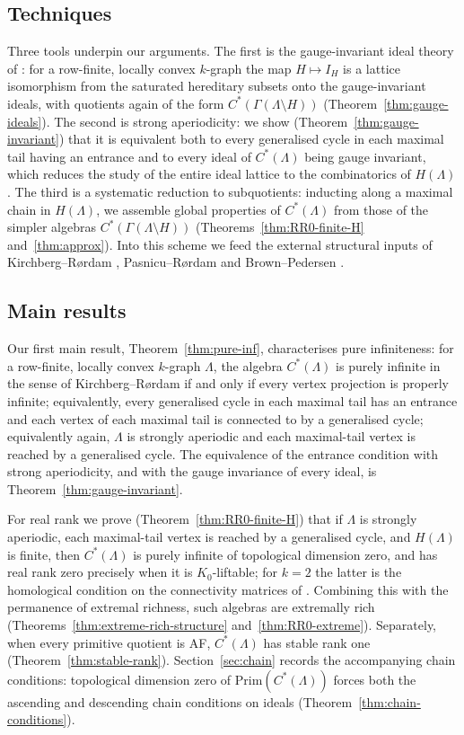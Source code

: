 \documentclass[12pt]{amsart}
\theoremstyle{plain}
\theoremstyle{definition}
\theoremstyle{remark}
\newcommand{\Prim}{\mathrm{Prim}}
\begin{document}
\subsection*{Techniques}
Three tools underpin our arguments. The first is the gauge-invariant ideal
theory of \cite{RSY1,KaP}: for a row-finite, locally convex $k$-graph the map
$H\mapsto I_H$ is a lattice isomorphism from the saturated hereditary subsets
onto the gauge-invariant ideals, with quotients again of the form
$C^*(\Gamma(\Lambda\setminus H))$ (Theorem~\ref{thm:gauge-ideals}). The second is
strong aperiodicity: we show (Theorem~\ref{thm:gauge-invariant}) that it is
equivalent both to every generalised cycle in each maximal tail having an
entrance and to every ideal of $C^*(\Lambda)$ being gauge invariant, which
reduces the study of the entire ideal lattice to the combinatorics of
$H(\Lambda)$. The third is a systematic reduction to subquotients: inducting
along a maximal chain in $H(\Lambda)$, we assemble global properties of
$C^*(\Lambda)$ from those of the simpler algebras $C^*(\Gamma(\Lambda\setminus H))$
(Theorems~\ref{thm:RR0-finite-H} and~\ref{thm:approx}). Into this scheme we feed
the external structural inputs of Kirchberg--R\o rdam \cite{KR},
Pasnicu--R\o rdam \cite{PR} and Brown--Pedersen \cite{BP,BP2,BP3}.

\subsection*{Main results}
Our first main result, Theorem~\ref{thm:pure-inf}, characterises pure
infiniteness: for a row-finite, locally convex $k$-graph $\Lambda$, the algebra
$C^*(\Lambda)$ is purely infinite in the sense of Kirchberg--R\o rdam if and only
if every vertex projection is properly infinite; equivalently, every generalised
cycle in each maximal tail has an entrance and each vertex of each maximal tail
is connected to by a generalised cycle; equivalently again, $\Lambda$ is
strongly aperiodic and each maximal-tail vertex is reached by a generalised
cycle. The equivalence of the entrance condition with strong aperiodicity, and
with the gauge invariance of every ideal, is Theorem~\ref{thm:gauge-invariant}.

For real rank we prove (Theorem~\ref{thm:RR0-finite-H}) that if $\Lambda$ is
strongly aperiodic, each maximal-tail vertex is reached by a generalised cycle,
and $H(\Lambda)$ is finite, then $C^*(\Lambda)$ is purely infinite of
topological dimension zero, and has real rank zero precisely when it is
$K_0$-liftable; for $k=2$ the latter is the homological condition on the
connectivity matrices of \cite{PSS2}. Combining this with the permanence of
extremal richness, such algebras are extremally rich
(Theorems~\ref{thm:extreme-rich-structure} and~\ref{thm:RR0-extreme}).
Separately, when every primitive quotient is AF, $C^*(\Lambda)$ has stable
rank one (Theorem~\ref{thm:stable-rank}). Section~\ref{sec:chain} records the
accompanying chain conditions: topological dimension zero of
$\Prim(C^*(\Lambda))$ forces both the ascending and descending chain conditions
on ideals (Theorem~\ref{thm:chain-conditions}).
\end{document}

